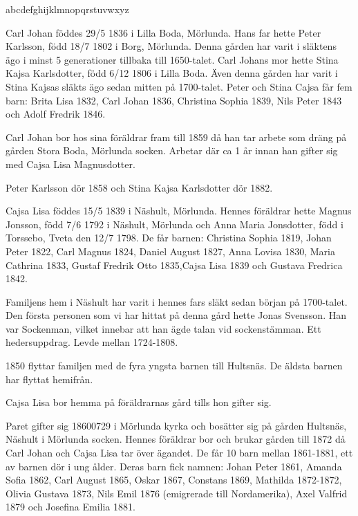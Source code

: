 




\hbox{abcdefghijklmnopqrstuvwxyz}
\the{}


Carl Johan föddes 29/5 1836 i Lilla Boda, Mörlunda. 
Hans far hette Peter Karlsson, född 18/7 1802 i Borg, Mörlunda. 
Denna gården har varit i släktens ägo i minst 5 generationer tillbaka till 1650-talet. Carl Johans mor hette Stina Kajsa Karlsdotter, född 6/12 1806 i Lilla Boda. Även denna gården har varit i Stina Kajsas släkts ägo sedan mitten på 1700-talet.
Peter och Stina Cajsa får fem barn: Brita Lisa 1832, Carl Johan 1836, Christina Sophia 1839, Nils Peter 1843 och Adolf Fredrik 1846.

Carl Johan bor hos sina föräldrar fram till 1859 då han tar arbete som dräng på gården Stora Boda, Mörlunda socken. Arbetar där ca 1 år innan han gifter sig med Cajsa Lisa Magnusdotter.

Peter Karlsson dör 1858 och Stina Kajsa Karlsdotter dör 1882.



Cajsa Lisa föddes 15/5 1839 i Näshult, Mörlunda. Hennes föräldrar hette Magnus Jonsson, född 7/6 1792 i Näshult, Mörlunda och Anna Maria Jonsdotter, född i Torssebo, Tveta den 12/7 1798.
De får barnen: Christina Sophia 1819, Johan Peter 1822, Carl Magnus 1824, Daniel August 1827, Anna Lovisa 1830, Maria Cathrina 1833, Gustaf Fredrik Otto 1835,Cajsa Lisa 1839 och Gustava Fredrica 1842.
 
Familjens hem i Näshult har varit i hennes fars släkt sedan början på 1700-talet.
Den första personen som vi har hittat på denna gård hette Jonas Svensson. Han var Sockenman,  vilket innebar att han ägde talan vid sockenstämman. Ett hedersuppdrag.
Levde mellan 1724-1808.

1850 flyttar familjen med de fyra yngsta barnen till Hultsnäs. De äldsta barnen har flyttat hemifrån.

Cajsa Lisa bor hemma på föräldrarnas gård tills hon gifter sig.




Paret gifter sig 18600729 i Mörlunda kyrka och bosätter sig på gården Hultsnäs, Näshult i Mörlunda socken. Hennes föräldrar bor och brukar gården till 1872 då Carl Johan och Cajsa Lisa tar över ägandet.
De får 10 barn mellan 1861-1881, ett av barnen dör i ung ålder.
Deras barn fick namnen: Johan Peter 1861, Amanda Sofia 1862, Carl August 1865, Oskar 1867, Constans 1869, Mathilda 1872-1872, Olivia Gustava 1873, Nils Emil 1876 (emigrerade till Nordamerika), Axel Valfrid 1879 och Josefina Emilia 1881.


